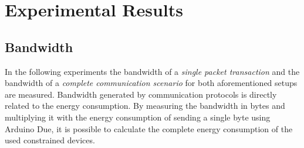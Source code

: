 \section{Experimental Results}
\subsection{Bandwidth}
In the following experiments the bandwidth of a \emph{single packet transaction} and the bandwidth of a \emph{complete communication scenario} for both aforementioned setups are measured. 
Bandwidth generated by communication protocols is directly related to the energy consumption. By measuring the bandwidth in bytes and multiplying it with the energy consumption of sending a single byte using Arduino Due, it is possible to calculate the complete energy consumption of the used constrained devices. 

